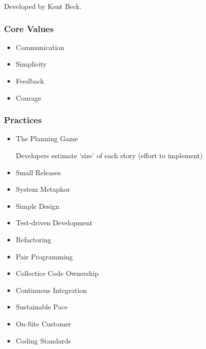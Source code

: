 \documentclass[../ESOF_notes.tex]{subfiles}
\begin{document}
Developed by Kent Beck.

\subsubsection{Core Values}

\begin{itemize}
    \item Communication
    \item Simplicity
    \item Feedback
    \item Courage
\end{itemize}

\subsubsection{Practices}

\begin{itemize}
    \item The Planning Game
    
    Developers estimate ‘size’ of each story (effort to
implement)
    \item Small Releases
    \item System Metaphor
    \item Simple Design
    \item Test-driven Development
    \item Refactoring
    \item Pair Programming
    \item Collectice Code Ownership
    \item Continuous Integration
    \item Sustainable Pace
    \item On-Site Customer
    \item Coding Standards
\end{itemize}
\end{document}
